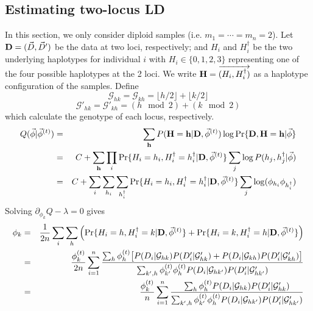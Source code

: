 \documentclass[pdftex,10pt]{book}
\begin{document}
\subsection{Estimating two-locus LD}
In this section, we only consider diploid samples
(i.e. $m_1=\cdots=m_n=2$). Let ${\bf D}=(\vec{D},\vec{D}')$ be the data
at two loci, respectively; and $H_i$ and $H^{\dag}_i$ be the two
underlying haplotypes for individual $i$ with $H_i\in\{0,1,2,3\}$
representing one of the four possible haplotypes at the 2 loci. We write
${\bf H}=\overrightarrow{(H_i,H^{\dag}_i)}$ as a haplotype configuration of the
samples. Define
$$
\mathcal{G}_{hk}=\mathcal{G}_{kh}=\lfloor h/2\rfloor+\lfloor k/2\rfloor
$$
$$
\mathcal{G}'_{hk}=\mathcal{G}'_{kh}=(h\mod 2)+(k\mod 2)
$$
which calculate the genotype of each locus, respectively.
\begin{eqnarray*}
  Q(\vec{\phi}|\vec{\phi}^{(t)})&=&\sum_{\bf h}P({\bf H}={\bf h}|{\bf D},\vec{\phi}^{(t)})\log\Pr\{{\bf D},{\bf H}={\bf h}|\vec{\phi}\}\\
  &=&C+\sum_{\bf h}\prod_i\Pr\{H_i=h_i,H^{\dag}_i=h^{\dag}_i|{\bf D},\vec{\phi}^{(t)}\}\sum_j\log P(h_j,h^{\dag}_j|\vec{\phi})\\
  &=&C+\sum_i\sum_{h_i}\sum_{h^{\dag}_i}\Pr\{H_i=h_i,H^{\dag}_i=h^{\dag}_i|{\bf D},\vec{\phi}^{(t)}\}\sum_j\log(\phi_{h_i}\phi_{h^{\dag}_i})
\end{eqnarray*}
Solving $\partial_{\phi_k}Q-\lambda=0$ gives
\begin{eqnarray*}
\phi_k&=&\frac{1}{2n}\sum_i\sum_h\left(\Pr\{H_i=h,H^{\dag}_i=k|{\bf D},\vec{\phi}^{(t)}\}+\Pr\{H_i=k,H^{\dag}_i=h|{\bf D},\vec{\phi}^{(t)}\}\right)\\
&=&\frac{\phi^{(t)}_k}{2n}\sum_{i=1}^n\frac{\sum_{h}\phi^{(t)}_h\big[P(D_i|{\cal G}_{hk})P(D'_i|{\cal G}'_{hk})+P(D_i|{\cal G}_{kh})P(D'_i|{\cal G}'_{kh})\big]}{\sum_{k',h}\phi^{(t)}_{k'}\phi^{(t)}_hP(D_i|{\cal G}_{hk'})P(D'_i|{\cal G}'_{hk'})}\\
&=&\frac{\phi^{(t)}_k}{n}\sum_{i=1}^n\frac{\sum_{h}\phi^{(t)}_hP(D_i|{\cal G}_{hk})P(D'_i|{\cal G}'_{hk})}{\sum_{k',h}\phi^{(t)}_{k'}\phi^{(t)}_hP(D_i|{\cal G}_{hk'})P(D'_i|{\cal G}'_{hk'})}
\end{eqnarray*}
\end{document}

